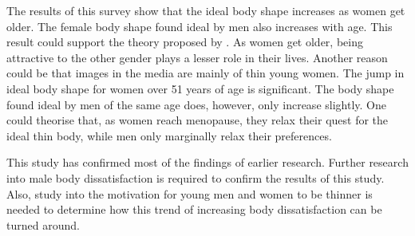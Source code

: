 \documentclass[a4paper, jou]{apa6}
\begin{document}
The results of this survey show that the ideal body shape increases as women get older. The female body shape found ideal by men also increases with age. This result could support the theory proposed by . As women get older, being attractive to the other gender plays a lesser role in their lives. Another reason could be that images in the media are mainly of thin young women. The jump in ideal body shape for women over 51 years of age is significant. The body shape found ideal by men of the same age does, however, only increase slightly. One could theorise that, as women reach menopause, they relax their quest for the ideal thin body, while men only marginally relax their preferences.

This study has confirmed most of the findings of earlier research. Further research into male body dissatisfaction is required to confirm the results of this study. Also, study into the motivation for young men and women to be thinner is needed to determine how this trend of increasing body dissatisfaction can be turned around.



\end{document}

